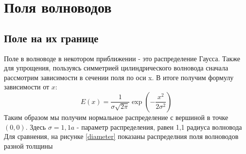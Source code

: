 \chapter{Поля волноводов}
\section{Поле на их границе}
Поле в волноводе в некотором приближении - это распределение Гаусса. Также для упрощения, пользуясь симметрией цилиндрического волновода сначала рассмотрим зависимости в сечении поля по оси x. В итоге получим формулу зависимости от $x$:
\begin{equation}
  \label{gauss}
  E(x)=\frac{1}{\sigma\sqrt{2\pi}}\exp\left(-\frac{x^2}{2\sigma^2}\right)
\end{equation}
Таким образом мы получим нормальное распределение с вершиной в точке $(0,0)$.
Здесь $\sigma = 1,1a$ - параметр распределения, равен 1,1 радиуса волновода
Для сравнения, на рисунке \ref{diameter} показаны распределния поля волноводов разной толщины

